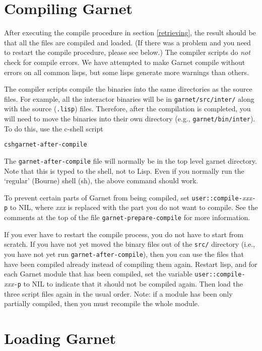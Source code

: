 \documentclass{report}
\newenvironment{programexample}{\begin{alltt}}{\end{alltt}}
\begin{document}
\section{Compiling Garnet}
\label{compilinggarnet}
 

After executing the compile procedure in section \ref{retrieving}, the
result should be that all the files are compiled and loaded.  (If
there was a problem and you need to restart the compile procedure,
please see below.)  The compiler scripts do {\it not} check for
compile errors.  We have attempted to make Garnet compile without
errors on all common lisps, but some lisps generate more warnings than
others.

The compiler scripts compile the binaries into the same directories as
the source files.  For example, all the interactor binaries will be in
\texttt{garnet/src/inter/} along with the source (\texttt{.lisp}) files.
Therefore, after the compilation is completed, you will need to move
the binaries into their own directory (e.g., \texttt{garnet/bin/inter}).
To do this, use the c-shell script
\begin{programexample}
  csh garnet-after-compile
\end{programexample}
The \texttt{garnet-after-compile} file will normally be in the top level
garnet directory.  Note that this is typed to the shell, not to Lisp.
Even if you normally run the `regular' (Bourne) shell (sh), the above
command should work.

To prevent certain parts of Garnet from being compiled, set
\texttt{user::compile-}{\it xxx}\texttt{-p} to NIL, where {\it xxx} is
replaced with the part you do not want to compile.  See the comments
at the top of the file \texttt{garnet-prepare-compile} for more
information.

If you ever have to restart the compile process, you do not have to
start from scratch.  If you have not yet moved the binary files out of
the \texttt{src/} directory (i.e., you have not yet run
\texttt{garnet-after-compile}), then you can use the files that have been
compiled already instead of compiling them again.  Restart lisp, and
for each Garnet module that has been compiled, set the variable
\texttt{user::compile-}{\it xxx}\texttt{-p} to NIL to indicate that it should
not be compiled again.  Then load the three script files again in the
usual order.  Note: if a module has been only partially compiled, then
you must recompile the whole module.


\section{Loading Garnet}
\label{loading-garnet}
  
 
\end{document}
